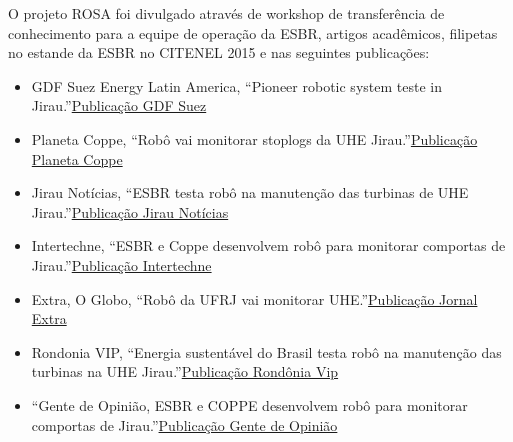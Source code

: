 O projeto ROSA foi divulgado através de workshop de transferência de
conhecimento para a equipe de operação da ESBR, artigos acadêmicos, filipetas no
estande da ESBR no CITENEL 2015 e nas seguintes publicações:

\begin{itemize}
\item GDF Suez Energy Latin America, ``Pioneer robotic system teste in
Jirau.''\href{https://www.engie.com/wp-content/uploads/2015/05/gdf-suez-second-supplement-may-21-2015.pdf}{Publicação
GDF Suez}
\item Planeta Coppe, ``Robô vai monitorar stoplogs da UHE
Jirau.''\href{http://www.planeta.coppe.ufrj.br/artigo.php?artigo=1837}{Publicação Planeta Coppe}
\item Jirau Notícias, ``ESBR testa robô na manutenção das turbinas de UHE
Jirau.''\href{}{Publicação Jirau Notícias}
\item Intertechne, ``ESBR e Coppe desenvolvem robô para monitorar comportas de
Jirau.''\href{http://www.intertechne.com.br/index.php?option=com_content&task=view&id=1120&Itemid=2}{Publicação
Intertechne}
\item Extra, O Globo, ``Robô da UFRJ vai monitorar
UHE.''\href{http://extra.globo.com/noticias/educacao/vida-de-calouro/robo-da-ufrj-vai-monitorar-usina-hidreletrica-jirau-13378837.html}{Publicação
Jornal Extra}
\item Rondonia VIP, ``Energia sustentável do Brasil testa robô na manutenção das
turbinas na UHE Jirau.''\href{http://www.jornalrondoniavip.com.br/noticia/energia-sustentavel-do-brasil-testa-robo-na-manutencao-das-turbinas-na-usina-hidreletrica-jirau,geral,16733.html}{Publicação Rondônia Vip}
\item ``Gente de Opinião, ESBR e COPPE desenvolvem robô para monitorar comportas
de Jirau.''\href{http://www.gentedeopiniao.com.br/mobile/lerConteudoEnergia.php?news=127975}{Publicação Gente de Opinião}
\end{itemize}  
